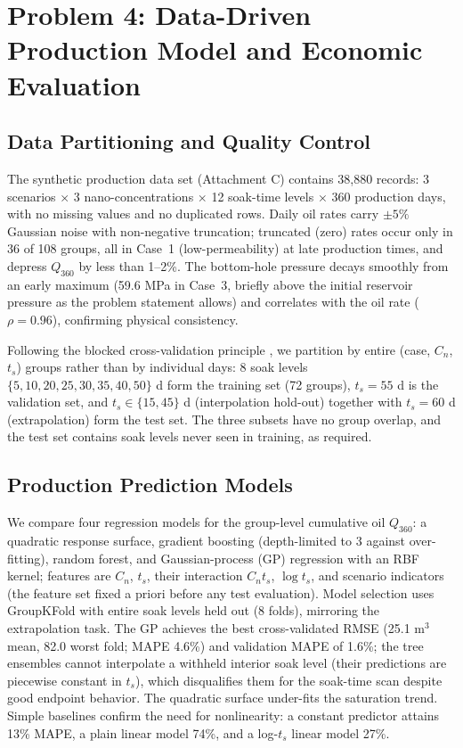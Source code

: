 \section{Problem 4: Data-Driven Production Model and Economic Evaluation}

\subsection{Data Partitioning and Quality Control}
The synthetic production data set (Attachment C) contains 38,880 records:
3 scenarios $\times$ 3 nano-concentrations $\times$ 12 soak-time levels
$\times$ 360 production days, with no missing values and no duplicated rows.
Daily oil rates carry $\pm5\%$ Gaussian noise with non-negative truncation;
truncated (zero) rates occur only in 36 of 108 groups, all in Case~1
(low-permeability) at late production times, and depress $Q_{360}$ by less
than 1--2\%. The bottom-hole pressure decays smoothly from an early maximum
(59.6 MPa in Case~3, briefly above the initial reservoir pressure as the
problem statement allows) and correlates with the oil rate ($\rho = 0.96$),
confirming physical consistency.

Following the blocked cross-validation principle \cite{p4-01}, we partition
by entire (case, $C_n$, $t_s$) groups rather than by individual days:
8 soak levels $\{5,10,20,25,30,35,40,50\}$ d form the training set (72 groups),
$t_s = 55$ d is the validation set, and $t_s \in \{15,45\}$ d (interpolation
hold-out) together with $t_s = 60$ d (extrapolation) form the test set.
The three subsets have no group overlap, and the test set contains soak levels
never seen in training, as required.

\subsection{Production Prediction Models}
We compare four regression models for the group-level cumulative oil
$Q_{360}$: a quadratic response surface, gradient boosting (depth-limited to
3 against over-fitting), random forest, and Gaussian-process (GP) regression
with an RBF kernel; features are $C_n$, $t_s$, their interaction $C_n t_s$,
$\log t_s$, and scenario indicators (the feature set fixed a priori before
any test evaluation). Model selection uses GroupKFold with entire soak levels held
out (8 folds), mirroring the extrapolation task. The GP achieves the best
cross-validated RMSE (25.1 m$^3$ mean, 82.0 worst fold; MAPE 4.6\%) and
validation MAPE of 1.6\%; the tree
ensembles cannot interpolate a withheld interior soak level (their
predictions are piecewise constant in $t_s$), which disqualifies them for the
soak-time scan despite good endpoint behavior. The quadratic surface
under-fits the saturation trend. Simple baselines confirm the need for
nonlinearity: a constant predictor attains 13\% MAPE, a plain linear model
74\%, and a log-$t_s$ linear model 27\%.

